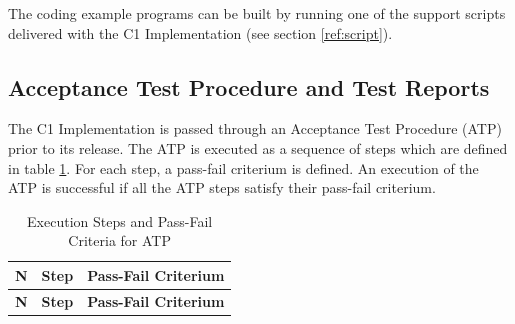 \documentclass[a4paper,10pt]{article}
\begin{document}
The coding example programs can be built by running one of the support scripts delivered with the C1 Implementation (see section \ref{ref:script}). 

\subsection{Acceptance Test Procedure and Test Reports}\label{ref:atp}
The C1 Implementation is passed through an Acceptance Test Procedure (ATP) prior to its release. The ATP is executed as a sequence of steps which are defined in table \ref{tab:atp}. For each step, a pass-fail criterium is defined. An execution of the ATP is successful if all the ATP steps satisfy their pass-fail criterium.

\begin{longtable}{|l|p{5.2cm}|p{5.2cm}|}
\caption{Execution Steps and Pass-Fail Criteria for ATP}\label{tab:atp} \\
\hline
\rowcolor{gray}
\textbf{N} & \textbf{Step} & \textbf{Pass-Fail Criterium} \\
\hline\hline
\endfirsthead
\rowcolor{gray}
\textbf{N} & \textbf{Step} & \textbf{Pass-Fail Criterium} \\
\hline\hline
\endhead


\end{longtable}
\end{document}
